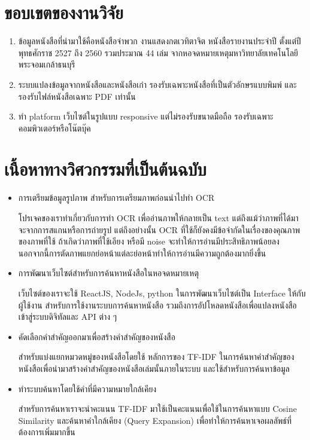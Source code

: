 \section{ขอบเขตของงานวิจัย}
\begin{enumerate}
    \item ข้อมูลหนังสือที่นำมาใช้คือหนังสือจำพวก งานแสดงกตเวทิตาจิต หนังสือรายงานประจำปี ตั้งแต่ปีพุทธศักราช 2527 ถึง 2560 รวมประมาณ 44 เล่ม จากหอจดหมายเหตุมหาวิทยาลัยเทคโนโลยีพระจอมเกล้าธนบุรี
    \item ระบบแปลงข้อมูลจากหนังสือและหนังสือเก่า รองรับเฉพาะหนังสือที่เป็นตัวอักษรแบบพิมพ์ และรองรับไฟล์หนังสือเฉพาะ PDF เท่านั้น
    \item ทำ platform เว็บไซต์ในรูปแบบ responsive แต่ไม่รองรับขนาดมือถือ รองรับเฉพาะคอมพิวเตอร์หรือโน๊ตบุ๊ค
\end{enumerate}
\section{เนื้อหาทางวิศวกรรมที่เป็นต้นฉบับ}
\begin{itemize}
    \item การเตรียมข้อมูลรูปภาพ สำหรับการเตรียมภาพก่อนนำไปทำ OCR 
    
    โปรเจคของเราทำเกี่ยวกับการทำ OCR เพื่ออ่านภาพให้กลายเป็น text แต่ถึงแม้ว่าภาพที่ได้มาจะจากการสแกนหรือการถ่ายรูป แต่ถึงอย่างนั้น OCR ที่ใช้ก็ยังคงมีข้อจำกัดในเรื่องของคุณภาพของภาพที่ใช้ ถ้าเกิดว่าภาพที่ใช้เอียง หรือมี noise จะทำให้การอ่านมีประสิทธิภาพน้อยลง นอกจากนี้การตัดภาพแยกย่อหน้าแต่ละย่อหน้าทำให้การอ่านมีความถูกต้องมากยิ่งขึ้น

    \item การพัฒนาเว็บไซต์สำหรับการค้นหาหนังสือในหอจดหมายเหตุ
    
    เว็บไซต์ของเราจะใช้ ReactJS, NodeJs, python  ในการพัฒนาเว็บไซต์เป็น Interface ให้กับผู้ใช้งาน สำหรับการใช้งานระบบการค้นหาหนังสือ รวมถึงการอัปโหลดหนังสือเพื่อแปลงหนังสือเข้าสู่ระบบดิจิทัลและ API ต่าง ๆ
    
    \item คัดเลือกคำสำคัญออกมาเพื่อสร้างคำสำคัญของหนังสือ
    
    สำหรับแบ่งแยกหมวดหมู่ของหนังสือโดยใช้ หลักการของ TF-IDF ในการค้นหาคำสำคัญของหนังสือเพื่อนำมาสร้างคำสำคัญของหนังสือเล่มนั้นภายในระบบ และใช้สำหรับการค้นหาข้อมูล
    
    \item ทำระบบค้นหาโดยใช้คำที่มีความหมายใกล้เคียง
    
    สำหรับการค้นหาเราจะนำคะแนน TF-IDF มาใช้เป็นคะแนนเพื่อใช้ในการค้นหาแบบ Cosine Similarity และค้นหาคำใกล้เคียง (Query Expansion) เพื่อทำให้การค้นหาเจอผลลัพธ์ที่ต้องการเพิ่มมากขึ้น
    
\end{itemize}
